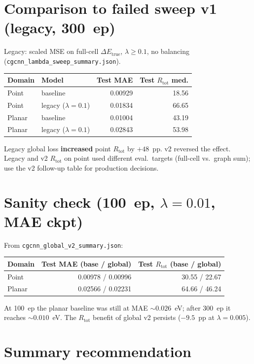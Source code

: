 \documentclass[11pt,a4paper]{article}
\newcommand{\dEtrue}{\Delta E_{\mathrm{true}}}
\begin{document}
\section*{Comparison to failed sweep v1 (legacy, 300~ep)}

Legacy: scaled MSE on full-cell $\dEtrue$, $\lambda\ge 0.1$, no balancing (\texttt{cgcnn\_lambda\_sweep\_summary.json}).

{\footnotesize
\begin{tabularx}{\linewidth}{@{}llrr@{}}
  \toprule
  Domain & Model & Test MAE & Test $R_{\mathrm{tot}}$ med. \\
  \midrule
  Point  & baseline           & 0.00929 & 18.56 \\
  Point  & legacy ($\lambda=0.1$) & 0.01834 & 66.65 \\
  Planar & baseline           & 0.01004 & 43.19 \\
  Planar & legacy ($\lambda=0.1$) & 0.02843 & 53.98 \\
  \bottomrule
\end{tabularx}
}

\noindent Legacy global loss \textbf{increased} point $R_{\mathrm{tot}}$ by $+48$~pp. v2 reversed the effect. Legacy and v2 $R_{\mathrm{tot}}$ on point used different eval.\ targets (full-cell vs.\ graph sum); use the v2 follow-up table for production decisions.

\section*{Sanity check (100~ep, $\lambda=0.01$, MAE ckpt)}

From \texttt{cgcnn\_global\_v2\_summary.json}:

{\footnotesize
\begin{tabularx}{\linewidth}{@{}lrr@{}}
  \toprule
  Domain & Test MAE (base / global) & Test $R_{\mathrm{tot}}$ (base / global) \\
  \midrule
  Point  & 0.00978 / 0.00996 & 30.55 / 22.67 \\
  Planar & 0.02566 / 0.02231 & 64.66 / 46.24 \\
  \bottomrule
\end{tabularx}
}

\noindent At 100~ep the planar baseline was still at MAE ${\sim}0.026$~eV; after 300~ep it reaches ${\sim}0.010$~eV. The $R_{\mathrm{tot}}$ benefit of global v2 persists ($-9.5$~pp at $\lambda=0.005$).

\section*{Summary recommendation}
\end{document}
